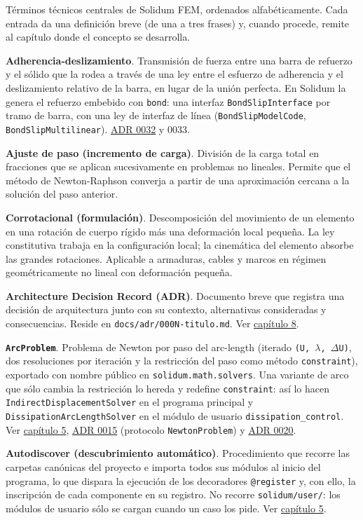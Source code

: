 \documentclass[11pt,oneside]{report}
\begin{document}
Términos técnicos centrales de Solidum FEM, ordenados alfabéticamente. Cada entrada da una definición breve (de una a tres frases) y, cuando procede, remite al capítulo donde el concepto se desarrolla.

\textbf{Adherencia-deslizamiento}. Transmisión de fuerza entre una barra de refuerzo y el sólido que la rodea a través de una ley entre el esfuerzo de adherencia y el deslizamiento relativo de la barra, en lugar de la unión perfecta. En Solidum la genera el refuerzo embebido con \texttt{bond}: una interfaz \texttt{BondSlipInterface} por tramo de barra, con una ley de interfaz de línea (\texttt{BondSlipModelCode}, \texttt{BondSlipMultilinear}). \hyperref[adr:0032]{ADR 0032} y 0033.

\textbf{Ajuste de paso (incremento de carga)}. División de la carga total en fracciones que se aplican sucesivamente en problemas no lineales. Permite que el método de Newton-Raphson converja a partir de una aproximación cercana a la solución del paso anterior.

\textbf{Corrotacional (formulación)}. Descomposición del movimiento de un elemento en una rotación de cuerpo rígido más una deformación local pequeña. La ley constitutiva trabaja en la configuración local; la cinemática del elemento absorbe las grandes rotaciones. Aplicable a armaduras, cables y marcos en régimen geométricamente no lineal con deformación pequeña.

\textbf{Architecture Decision Record (ADR)}. Documento breve que registra una decisión de arquitectura junto con su contexto, alternativas consideradas y consecuencias. Reside en \texttt{docs/\allowbreak{}adr/\allowbreak{}000N-titulo.\allowbreak{}md}. Ver \hyperref[cap:8]{capítulo 8}.

\textbf{\texttt{ArcProblem}}. Problema de Newton por paso del arc-length (iterado \texttt{(U, \ensuremath{\lambda}, \ensuremath{\Delta}U)}, dos resoluciones por iteración y la restricción del paso como método \texttt{constraint}), exportado con nombre público en \texttt{solidum.\allowbreak{}math.\allowbreak{}solvers}. Una variante de arco que sólo cambia la restricción lo hereda y redefine \texttt{constraint}: así lo hacen \texttt{IndirectDisplacementSolver} en el programa principal y \texttt{DissipationArcLengthSolver} en el módulo de usuario \texttt{dissipation\_\allowbreak{}control}. Ver \hyperref[cap:5]{capítulo 5}, \hyperref[adr:0015]{ADR 0015} (protocolo \texttt{NewtonProblem}) y \hyperref[adr:0020]{ADR 0020}.

\textbf{Autodiscover (descubrimiento automático)}. Procedimiento que recorre las carpetas canónicas del proyecto e importa todos sus módulos al inicio del programa, lo que dispara la ejecución de los decoradores \texttt{@register} y, con ello, la inscripción de cada componente en su registro. No recorre \texttt{solidum/user/}: los módulos de usuario sólo se cargan cuando un caso los pide. Ver \hyperref[cap:5]{capítulo 5}.
\end{document}

